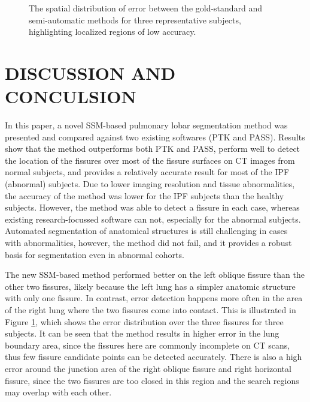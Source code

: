 \documentclass[]{spie}  %
\begin{document}
{\begin{figure}[htbp]
\begin{subfigure}
{\begin{minipage}[t]{0.24\linewidth}
  \centerline{}
	\end{minipage}%
   }%
  \label{fig:QuanlititativeResult-c} 
\end{subfigure}
\caption{The spatial distribution of error between the gold-standard and semi-automatic methods for three representative subjects, highlighting localized regions of low accuracy.}
\label{fig:QuanlititativeResult}
\end{figure}


\section{DISCUSSION AND CONCULSION}
In this paper, a novel SSM-based pulmonary lobar segmentation method was presented and compared against two existing softwares (PTK and PASS). Results show that the method outperforms both PTK and PASS, perform well to detect the location of the fissures over most of the fissure surfaces on CT images from normal subjects, and provides a relatively accurate result for most of the IPF (abnormal) subjects. Due to lower imaging resolution and tissue abnormalities, the accuracy of the method was lower for the IPF subjects than the healthy subjects. However, the method was able to detect a fissure in each case, whereas existing research-focussed software can not, especially for the abnormal subjects. Automated segmentation of anatomical structures is still challenging in cases with abnormalities, however, the method did not fail, and it provides a robust basis for segmentation even in abnormal cohorts.

The new SSM-based method performed better on the left oblique fissure than the other two fissures, likely because the left lung has a simpler anatomic structure with only one fissure. In contrast, error detection happens more often in the area of the right lung where the two fissures come into contact. This is illustrated in Figure \ref{fig:QuanlititativeResult}, which shows the error distribution over the three fissures for three subjects. It can be seen that the method results in higher error in the lung boundary area, since the fissures here are commonly incomplete on CT scans, thus few fissure candidate points can be detected accurately. There is also a high error around the junction area of the right oblique fissure and right horizontal fissure, since the two fissures are too closed in this region and the search regions may overlap with each other.

}
\end{document}
